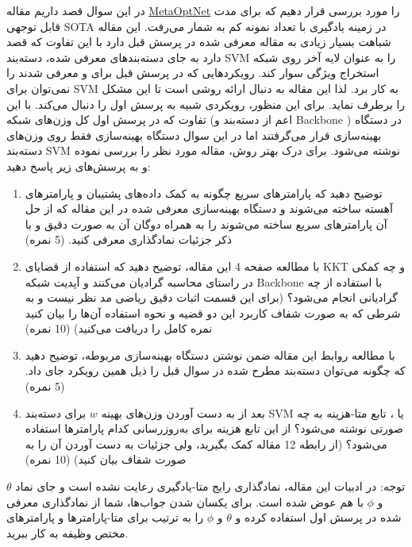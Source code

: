 \documentclass{article}
\begin{document}

در این سوال قصد داریم مقاله 
\href{https://arxiv.org/abs/1904.03758}{MetaOptNet}
را مورد بررسی قرار دهیم که برای مدت قابل توجهی SOTA
 در زمینه یادگیری با تعداد نمونه کم 
 به شمار می‌رفت. این مقاله شباهت بسیار زیادی به مقاله معرفی شده در پرسش قبل دارد با این تفاوت که قصد دارد به جای دسته‌بندهای معرفی شده، دسته‌بند SVM را به عنوان لایه آخر روی شبکه استخراج ویژگی سوار کند. رویکردهایی که در پرسش قبل برای 
و
معرفی شدند را نمی‌توان برای SVM به کار برد. لذا این مقاله به دنبال ارائه روشی است تا این مشکل را برطرف نماید. برای این منظور، رویکردی شبیه به پرسش اول را دنبال می‌کند. با این تفاوت که در پرسش اول کل وزن‌های شبکه 
(اعم از دسته‌بند و
 Backbone
 ) 
در دستگاه بهینه‌سازی قرار می‌گرفتند اما در این سوال دستگاه بهینه‌سازی فقط روی وزن‌های دسته‌بند SVM نوشته می‌شود. برای درک بهتر روش، مقاله مورد نظر را بررسی نموده و به پرسش‌های زیر پاسخ دهید:

\begin{enumerate}
	\item
	توضیح دهید که پارامترهای سریع چگونه به کمک داده‌های پشتیبان و پارامترهای آهسته ساخته می‌شوند و دستگاه بهینه‌سازی معرفی شده در این مقاله که از حل آن پارامترهای سریع ساخته می‌شوند را به همراه دوگان آن به صورت دقیق و با ذکر جزئیات نمادگذاری معرفی کنید. (5 نمره)
	\item
	با مطالعه صفحه 4 این مقاله، توضیح دهید که استفاده از قضایای KKT و 
	چه کمکی در راستای محاسبه گرادیان می‌کنند و آپدیت شبکه Backbone با استفاده از چه گرادیانی انجام می‌شود؟ (برای این قسمت اثبات دقیق ریاضی مد نظر نیست و به شرطی که به صورت شفاف کاربرد این دو قضیه و نحوه استفاده آن‌ها را بیان کنید نمره کامل را دریافت می‌کنید) (10 نمره)
	\item
	با مطالعه روابط این مقاله ضمن نوشتن دستگاه بهینه‌سازی مربوطه، توضیح دهید که چگونه می‌توان دسته‌بند
	مطرح شده در سوال قبل را ذیل همین رویکرد جای داد. (5 نمره)
	\item
	بعد از به دست‌ آوردن وزن‌های بهینه
	$w$
	برای دسته‌بند SVM یا 
	، تابع متا-هزینه به چه صورتی نوشته می‌شود؟ از این تابع هزینه برای به‌روزرسانی کدام پارامترها استفاده می‌شود؟ (از رابطه 12 مقاله کمک بگیرید، ولی جزئیات به دست آوردن آن را به صورت شفاف بیان کنید) (10 نمره)
	
\end{enumerate}

توجه: در ادبیات این مقاله، نمادگذاری رایج متا-یادگیری رعایت نشده است و جای نماد
$\theta$
و
$\phi$
با هم عوض شده است. برای یکسان شدن جواب‌ها، شما از نمادگذاری معرفی شده در پرسش اول استفاده کرده و 
$\theta$ و
$\phi$
را به ترتیب برای متا-پارامترها و پارامترهای مختص وظیفه به کار ببرید.
\end{document}
